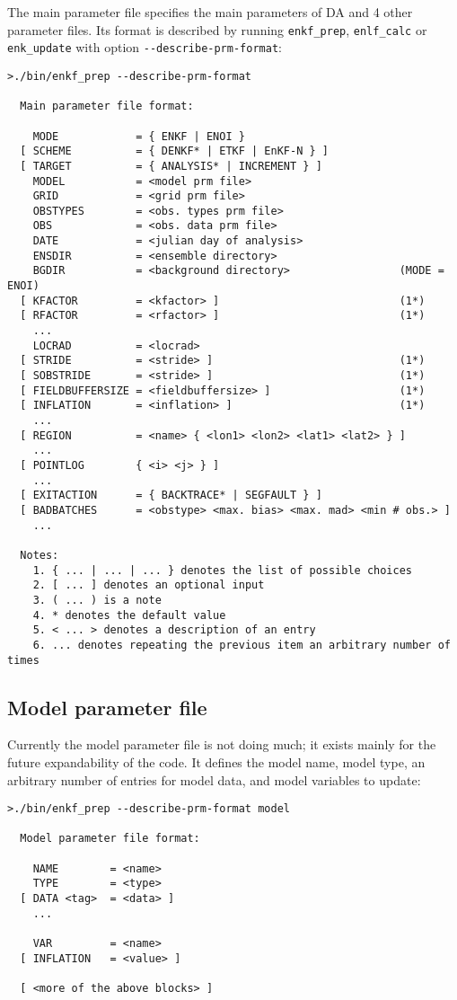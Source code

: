 \documentclass[11pt]{report}
\begin{document}
The main parameter file specifies the main parameters of DA and 4 other parameter files.
Its format is described by running \verb|enkf_prep|, \verb|enlf_calc| or \verb|enk_update| with option \verb|--describe-prm-format|:
\begin{Verbatim}[frame=single,fontsize=\footnotesize]
>./bin/enkf_prep --describe-prm-format

  Main parameter file format:

    MODE            = { ENKF | ENOI }
  [ SCHEME          = { DENKF* | ETKF | EnKF-N } ]
  [ TARGET          = { ANALYSIS* | INCREMENT } ]
    MODEL           = <model prm file>
    GRID            = <grid prm file>
    OBSTYPES        = <obs. types prm file>
    OBS             = <obs. data prm file>
    DATE            = <julian day of analysis>
    ENSDIR          = <ensemble directory>
    BGDIR           = <background directory>                 (MODE = ENOI)
  [ KFACTOR         = <kfactor> ]                            (1*)
  [ RFACTOR         = <rfactor> ]                            (1*)
    ...
    LOCRAD          = <locrad>
  [ STRIDE          = <stride> ]                             (1*)
  [ SOBSTRIDE       = <stride> ]                             (1*)
  [ FIELDBUFFERSIZE = <fieldbuffersize> ]                    (1*)
  [ INFLATION       = <inflation> ]                          (1*)
    ...
  [ REGION          = <name> { <lon1> <lon2> <lat1> <lat2> } ]
    ...
  [ POINTLOG        { <i> <j> } ]
    ...
  [ EXITACTION      = { BACKTRACE* | SEGFAULT } ]
  [ BADBATCHES      = <obstype> <max. bias> <max. mad> <min # obs.> ]
    ...

  Notes:
    1. { ... | ... | ... } denotes the list of possible choices
    2. [ ... ] denotes an optional input
    3. ( ... ) is a note
    4. * denotes the default value
    5. < ... > denotes a description of an entry
    6. ... denotes repeating the previous item an arbitrary number of times
\end{Verbatim}

\subsection{Model parameter file}

Currently the model parameter file is not doing much; it exists mainly for the future expandability of the code. 
It defines the model name, model type, an arbitrary number of entries for model data, and model variables to update:
\begin{Verbatim}[frame=single,fontsize=\footnotesize]
>./bin/enkf_prep --describe-prm-format model

  Model parameter file format:

    NAME        = <name>
    TYPE        = <type>
  [ DATA <tag>  = <data> ]
    ...

    VAR         = <name>
  [ INFLATION   = <value> ]

  [ <more of the above blocks> ]
\end{Verbatim}
\end{document}
